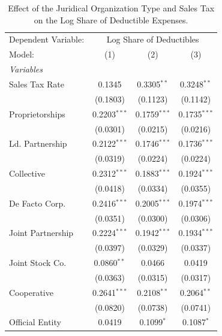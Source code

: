 \documentclass[
  12pt]{article}
\theoremstyle{definition}
\theoremstyle{remark}
\begin{document}
\begin{table}

\caption{\label{tbl-reg-ded}Effect of the Juridical Organization Type
and Sales Tax on the Log Share of Deductible Expenses.}

\begin{minipage}{\linewidth}

\begingroup
\centering
\begin{tabular}{lccc}
   \tabularnewline \midrule \midrule
   Dependent Variable: & \multicolumn{3}{c}{Log Share of Deductibles}\\
   Model:            & (1)            & (2)            & (3)\\  
   \midrule
   \emph{Variables}\\
   Sales Tax Rate    & 0.1345         & 0.3305$^{**}$  & 0.3248$^{**}$\\   
                     & (0.1803)       & (0.1123)       & (0.1142)\\   
   Proprietorships   & 0.2203$^{***}$ & 0.1759$^{***}$ & 0.1735$^{***}$\\   
                     & (0.0301)       & (0.0215)       & (0.0216)\\   
   Ld. Partnership   & 0.2122$^{***}$ & 0.1746$^{***}$ & 0.1736$^{***}$\\   
                     & (0.0319)       & (0.0224)       & (0.0224)\\   
   Collective        & 0.2312$^{***}$ & 0.1883$^{***}$ & 0.1924$^{***}$\\   
                     & (0.0418)       & (0.0334)       & (0.0355)\\   
   De Facto Corp.    & 0.2416$^{***}$ & 0.2005$^{***}$ & 0.1974$^{***}$\\   
                     & (0.0351)       & (0.0300)       & (0.0306)\\   
   Joint Partnership & 0.2224$^{***}$ & 0.1942$^{***}$ & 0.1934$^{***}$\\   
                     & (0.0397)       & (0.0329)       & (0.0337)\\   
   Joint Stock Co.   & 0.0860$^{**}$  & 0.0466         & 0.0419\\   
                     & (0.0363)       & (0.0315)       & (0.0317)\\   
   Cooperative       & 0.2641$^{***}$ & 0.2108$^{**}$  & 0.2064$^{**}$\\   
                     & (0.0820)       & (0.0738)       & (0.0741)\\   
   Official Entity   & 0.0419         & 0.1099$^{*}$   & 0.1087$^{*}$\\   

\end{tabular}
\end{minipage}
\end{table}
\end{document}
